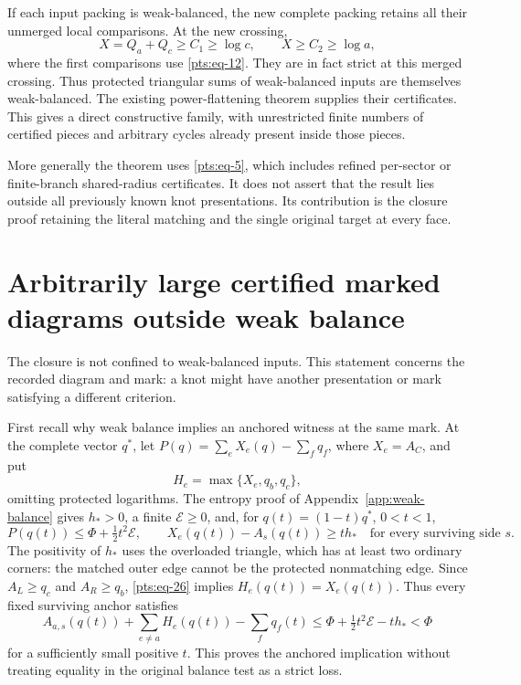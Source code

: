If each input packing is weak-balanced, the new complete packing retains
all their unmerged local comparisons. At the new crossing, \begin{equation}\label{pts:eq-24}
X=Q_a+Q_c\ge C_1\ge\log c,\qquad
 X\ge C_2\ge\log a,
\end{equation} where the first comparisons use \eqref{pts:eq-12}. They are in fact strict at this
merged crossing. Thus protected triangular sums of weak-balanced inputs
are themselves weak-balanced. The existing power-flattening theorem
supplies their certificates. This gives a direct constructive
family, with unrestricted finite numbers of certified pieces and
arbitrary cycles already present inside those pieces.

More generally the theorem uses \eqref{pts:eq-5}, which includes refined per-sector
or finite-branch shared-radius certificates. It does not assert that the
result lies outside all previously known knot presentations. Its
contribution is the closure proof retaining the literal matching and the
single original target at every face.

\section{Arbitrarily large certified marked diagrams outside weak
balance}\label{pts:sec-7}

The closure is not confined to weak-balanced inputs. This statement
concerns the recorded diagram and mark: a knot might have another
presentation or mark satisfying a different criterion.

First recall why weak balance implies an anchored witness at the same
mark. At the complete vector \(q^*\), let
\(P(q)=\sum_eX_e(q)-\sum_fq_f\), where \(X_e=A_C\), and put \begin{equation}\label{pts:eq-25}
H_e=\max\{X_e,q_b,q_c\},
\end{equation} omitting protected logarithms. The entropy proof of
Appendix~\ref{app:weak-balance} gives
\(h_*>0\), a finite \(\mathcal E\ge0\), and, for \(q(t)=(1-t)q^*\),
\(0<t<1\), \begin{equation}\label{pts:eq-26}
P(q(t))\le\Phi+\tfrac12t^2\mathcal E,\qquad
 X_e(q(t))-A_s(q(t))\ge t h_*
                   \quad\text{for every surviving side }s.
\end{equation} The positivity of \(h_*\) uses the overloaded triangle, which has at
least two ordinary corners: the matched outer edge cannot be the
protected nonmatching edge. Since \(A_L\ge q_c\) and \(A_R\ge q_b\),
\eqref{pts:eq-26} implies \(H_e(q(t))=X_e(q(t))\). Thus every fixed surviving anchor
satisfies \begin{equation}\label{pts:eq-27}
A_{a,s}(q(t))+\sum_{e\ne a}H_e(q(t))-\sum_fq_f(t)
 \le\Phi+\tfrac12t^2\mathcal E-t h_*<\Phi
\end{equation} for a sufficiently small positive \(t\). This proves the anchored
implication without treating equality in the original balance test as a
strict loss.

